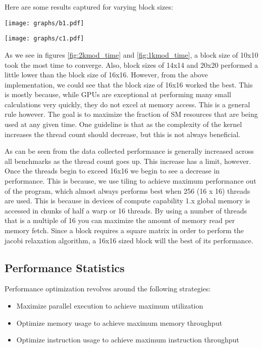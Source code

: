 \documentclass[10pt]{article}
\makeatletter
\newenvironment{figurehere}
{\def\@captype{figure}}
{}
\makeatother
\begin{document}
\begin{multicols}{2}
  Here are some results captured for varying block sizes:

  \begin{figurehere}
    \centering
    \texttt{[image: graphs/b1.pdf]}
    \caption{}
    \label{fig:2kmod_time}
  \end{figurehere}

  \begin{figurehere}
    \centering
    \texttt{[image: graphs/c1.pdf]}
    \caption{}
    \label{fig:1kmod_time}
  \end{figurehere}

  As we see in figures \ref{fig:2kmod_time} and \ref{fig:1kmod_time}, a block size of 10x10 took the most time to converge.
  Also, block sizes of 14x14 and 20x20 performed a little lower than the block size of 16x16.
  However, from the above implementation, we could see that the block size of 16x16 worked the best.
  This is mostly because, while GPUs are exceptional at performing many small calculations very quickly, they do not excel at memory access.
  This is a general rule however.
  The goal is to maximize the fraction of SM resources that are being used at any given time.
  One guideline is that as the complexity of the kernel increases the thread count should decrease, but this is not always beneficial.

  As can be seen from the data collected performance is generally increased across all benchmarks as the thread count goes up.
  This increase has a limit, however.
  Once the threads begin to exceed 16x16 we begin to see a decrease in performance.
  This is because, we use tiling to achieve maximum performance out of the program, which almost always performs best when 256 (16 x 16) threads are used.
  This is because in devices of compute capability 1.x global memory is accessed in chunks of half a warp or 16 threads.
  By using a number of threads that is a multiple of 16 you can maximize the amount of memory read per memory fetch.
  Since a block requires a square matrix in order to perform the jacobi relaxation algorithm, a 16x16 sized block will the best of its performance.

  \subsection{Performance Statistics}
  Performance optimization revolves around the following strategies: 
  \begin{itemize}
    \item Maximize parallel execution to achieve maximum utilization
    \item Optimize memory usage to achieve maximum memory throughput 
    \item Optimize instruction usage to achieve maximum instruction throughput 
  \end{itemize}


\end{multicols}
\end{document}
